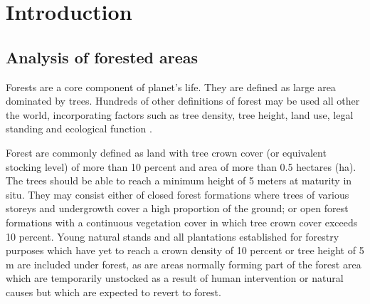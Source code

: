 
\chapter{Introduction} %
\label{Introduction} %


\startcontents[chapters]
\Mprintcontents





\section{Analysis of forested areas}
Forests are a core component of planet's life. They are defined as large area dominated by trees. Hundreds of other definitions of forest may be used all other the world, incorporating factors such as tree density, tree height, land use, legal standing and ecological function \citep{schuck2002compilation,achard2009vital}.

Forest are commonly defined as land with tree crown cover (or equivalent stocking level) of more than 10 percent and area of more than 0.5 hectares (ha). The trees should be able to reach a minimum height of 5 meters at maturity in situ. They may consist either of closed forest formations where trees of various storeys and undergrowth cover a high proportion of the ground; or open forest formations with a continuous vegetation cover in which tree crown cover exceeds 10 percent. Young natural stands and all plantations established for forestry purposes which have yet to reach a crown density of 10 percent or tree height of 5 m are included under forest, as are areas normally forming part of the forest area which are temporarily unstocked as a result of human intervention or natural causes but which are expected to revert to forest.


